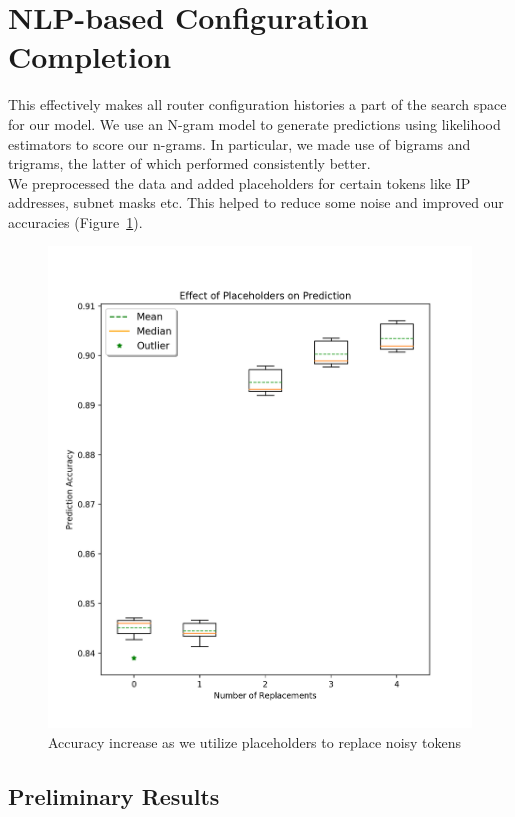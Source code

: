 \section{NLP-based Configuration Completion}

This effectively makes all router configuration histories a part of the search space for our model. We use an N-gram model to generate predictions using likelihood estimators to score our n-grams. In particular, we made use of bigrams and trigrams, the latter of which performed consistently better.\\

We preprocessed the data and added placeholders for certain tokens like IP addresses, subnet masks etc. This helped to reduce some noise and improved our accuracies (Figure~\ref{fig:replacement_analysis}).\\
\begin{figure}
	\centering
	\includegraphics[width=\columnwidth]{replacement_analysis.png}
	\caption{Accuracy increase as we utilize placeholders to replace noisy tokens}
    \label{fig:replacement_analysis}
\end{figure}

\subsection{Preliminary Results}

